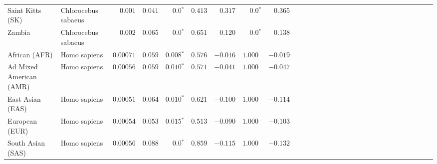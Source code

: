 \begin{center}
\begin{adjustbox}{width = 1\textwidth}
\begin{tabular}{|l|l|r|r|r|r|r|r|r|r|r|r|r|r|r|r|r|r|r|r|r|r|r|r|r|r|r|r|r|}
               Saint Kitts (SK) &  Chlorocebus sabaeus &           $ 0.001$ &                      $ 0.041$ &                  $\bm{0.0{^*}}$ &                                           $ 0.413$ &                      $ 0.317$ &                  $\bm{0.0{^*}}$ &                                           $ 0.365$ \\
                         Zambia &  Chlorocebus sabaeus &           $ 0.002$ &                      $ 0.065$ &                  $\bm{0.0{^*}}$ &                                           $ 0.651$ &                      $ 0.120$ &                  $\bm{0.0{^*}}$ &                                           $ 0.138$ \\
                  African (AFR) &         Homo sapiens &          $0.00071$ &                      $ 0.059$ &               $\bm{ 0.008{^*}}$ &                                           $ 0.576$ &                      $-0.016$ &                      $ 1.000~~$ &                                           $-0.019$ \\
        Ad Mixed American (AMR) &         Homo sapiens &          $0.00056$ &                      $ 0.059$ &               $\bm{ 0.010{^*}}$ &                                           $ 0.571$ &                      $-0.041$ &                      $ 1.000~~$ &                                           $-0.047$ \\
               East Asian (EAS) &         Homo sapiens &          $0.00051$ &                      $ 0.064$ &               $\bm{ 0.010{^*}}$ &                                           $ 0.621$ &                      $-0.100$ &                      $ 1.000~~$ &                                           $-0.114$ \\
                 European (EUR) &         Homo sapiens &          $0.00054$ &                      $ 0.053$ &               $\bm{ 0.015{^*}}$ &                                           $ 0.513$ &                      $-0.090$ &                      $ 1.000~~$ &                                           $-0.103$ \\
              South Asian (SAS) &         Homo sapiens &          $0.00056$ &                      $ 0.088$ &                  $\bm{0.0{^*}}$ &                                           $ 0.859$ &                      $-0.115$ &                      $ 1.000~~$ &                                           $-0.132$ \\
\bottomrule
\end{tabular}
\end{adjustbox}
\end{center}
\newpage

